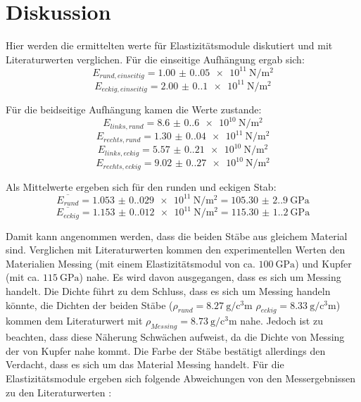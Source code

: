 \section{Diskussion}
\label{sec:Diskussion}
Hier werden die ermittelten werte für Elastizitätsmodule diskutiert und mit Literaturwerten verglichen.
Für die einseitige Aufhängung ergab sich:
\begin{equation*}
    E_{rund,einseitig} = \qty{1.00(0.05)e11}{\newton\per\meter\squared}
  \end{equation*}
\begin{equation*}
    E_{eckig,einseitig} = \qty{2.00(0.1)e11}{\newton\per\meter\squared}
\end{equation*}

Für die beidseitige Aufhängung kamen die Werte zustande:
\begin{equation*}
    E_{links,rund} = \qty{8.6(0.6)e10}{\newton\per\meter\squared}
  \end{equation*}
\begin{equation*}
    E_{rechts,rund} = \qty{1.30(0.04)e11}{\newton\per\meter\squared}
\end{equation*}
\begin{equation*}
    E_{links,eckig} = \qty{5.57(0.21)e10}{\newton\per\meter\squared}
\end{equation*}
\begin{equation*}
    E_{rechts,eckig} = \qty{9.02(0.27)e10}{\newton\per\meter\squared}
\end{equation*}

Als Mittelwerte ergeben sich für den runden und eckigen Stab:
\begin{equation*}
    \overline{E_{rund}} = \qty{1.053(0.029)e11}{\newton\per\meter\squared} = \qty{105.30(2.90)}{\giga\pascal}
\end{equation*}
\begin{equation*}
    \overline{E_{eckig}} = \qty{1.153(0.012)e11}{\newton\per\meter\squared} = \qty{115.30(1.20)}{\giga\pascal}
\end{equation*}

\noindent Damit kann angenommen werden, dass die beiden Stäbe aus gleichem Material sind. 
Verglichen mit Literaturwerten kommen den experimentellen Werten den Materialien
Messing (mit einem Elastizitätsmodul von ca. $\qty{100}{\giga\pascal}$) und 
Kupfer (mit ca. $\qty{115}{\giga\pascal}$) nahe. Es wird davon ausgegangen,
dass es sich um Messing handelt. Die Dichte führt zu dem Schluss, dass es sich 
um Messing handeln könnte, die Dichten der beiden Stäbe ($\rho_{rund} = \qty{8.27}{\gram\per\cubic\centi\meter}$
$\rho_{eckig} = \qty{8.33}{\gram\per\cubic\centi\meter}$) kommen dem Literaturwert 
mit $\rho_{Messing} = \qty{8.73}{\gram\per\cubic\centi\meter}$ nahe. Jedoch
ist zu beachten, dass diese Näherung Schwächen aufweist, da die Dichte von Messing 
der von Kupfer nahe kommt. Die Farbe der Stäbe bestätigt allerdings den Verdacht,
dass es sich um das Material Messing handelt. 
Für die Elastizitätsmodule ergeben sich folgende 
Abweichungen von den Messergebnissen zu den Literaturwerten \cite{elastizitaetsmodul}:

